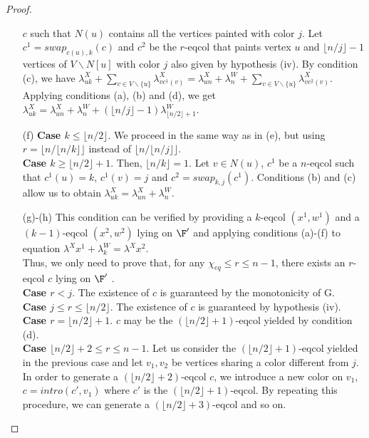 \begin{proof}
\begin{enumerate}
$c$ such that $N(u)$ contains all the vertices painted with color $j$. Let $c^1 = swap_{c(u),k}(c)$ and
$c^2$ be the $r$-eqcol that paints vertex $u$ and $\lfloor n/j \rfloor-1$ vertices of
$V \backslash N[u]$ with color $j$ also given by hypothesis (iv).
By condition (c), we have $\lambda^X_{uk} + \sum_{v \in V \backslash \{u\}} \lambda^X_{vc^1(v)} =
\lambda^X_{un} + \lambda^W_n + \sum_{v \in V \backslash \{u\}} \lambda^X_{vc^2(v)}$.
Applying conditions (a), (b) and (d), we get
$\lambda^X_{uk} = \lambda^X_{un} + \lambda^W_n +
(\lfloor n/j \rfloor - 1)\lambda^W_{\lfloor n/2 \rfloor + 1}$.
\item[(f)] \textbf{Case $k \leq \lfloor n/2 \rfloor$}. We proceed in the same way as in (e),
but using $r = \lfloor n/\lfloor n/k\rfloor \rfloor$ instead of $\lfloor n/\lfloor n/j\rfloor \rfloor$.\\
\textbf{Case $k \geq \lfloor n/2 \rfloor + 1$}. Then, $\lfloor n/k \rfloor = 1$. Let $v \in N(u)$, $c^1$ be a
$n$-eqcol such that $c^1(u) = k$, $c^1(v) = j$ and $c^2 = swap_{k,j}(c^1)$.
Conditions (b) and (c) allow us to obtain $\lambda^X_{uk} = \lambda^X_{un} + \lambda^W_n$.
\item[(g)-(h)] This condition can be verified by providing a $k$-eqcol $(x^1,w^1)$ and a $(k-1)$-eqcol
$(x^2,w^2)$ lying on $\F'$ and applying conditions (a)-(f) to equation $\lambda^X x^1 + \lambda^W_k = \lambda^X x^2$.\\
Thus, we only need to prove that, for any $\chi_{eq} \leq r \leq n-1$, there exists an $r$-eqcol $c$ lying on $\F'$ .\\ 
\textbf{Case $r < j$}. The existence of $c$ is guaranteed by the monotonicity of G.\\
\textbf{Case $j \leq r \leq \lfloor n/2 \rfloor$}. The existence of $c$ is guaranteed by hypothesis (iv).\\
\textbf{Case $r = \lfloor n/2 \rfloor + 1$}. $c$ may be the $(\lfloor n/2 \rfloor + 1)$-eqcol yielded by condition (d).\\
\textbf{Case $\lfloor n/2 \rfloor+2 \leq r \leq n-1$}. Let us consider the
$(\lfloor n/2 \rfloor + 1)$-eqcol yielded in the previous case and let $v_1, v_2$ be vertices sharing a color
different from $j$. In order to generate a $(\lfloor n/2 \rfloor + 2)$-eqcol $c$, we introduce a new color on $v_1$,
\ie $c = intro(c',v_1)$ where $c'$ is the $(\lfloor n/2 \rfloor + 1)$-eqcol. By repeating this
procedure, we can generate a $(\lfloor n/2 \rfloor + 3)$-eqcol and so on.
\end{enumerate}
\end{proof}

